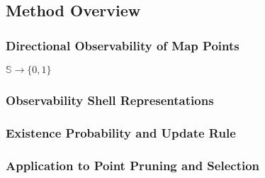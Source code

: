 \subsection{Method Overview}

\subsubsection{Directional Observability of Map Points}

$\mathbb{S}\rightarrow\{0, 1\}$

\subsubsection{Observability Shell Representations}

\subsubsection{Existence Probability and Update Rule}

\subsubsection{Application to Point Pruning and Selection}
